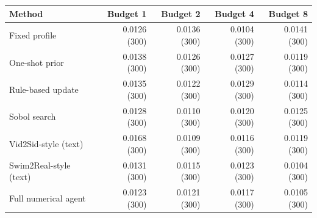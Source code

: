 \begin{tabular}{lrrrr}
\toprule
Method & Budget 1 & Budget 2 & Budget 4 & Budget 8 \\
\midrule
Fixed profile & 0.0126 (300) & 0.0136 (300) & 0.0104 (300) & 0.0141 (300) \\
One-shot prior & 0.0138 (300) & 0.0126 (300) & 0.0127 (300) & 0.0119 (300) \\
Rule-based update & 0.0135 (300) & 0.0122 (300) & 0.0129 (300) & 0.0114 (300) \\
Sobol search & 0.0128 (300) & 0.0110 (300) & 0.0120 (300) & 0.0125 (300) \\
Vid2Sid-style (text) & 0.0168 (300) & 0.0109 (300) & 0.0116 (300) & 0.0119 (300) \\
Swim2Real-style (text) & 0.0131 (300) & 0.0115 (300) & 0.0123 (300) & 0.0104 (300) \\
Full numerical agent & 0.0123 (300) & 0.0121 (300) & 0.0117 (300) & 0.0105 (300) \\
\bottomrule
\end{tabular}
